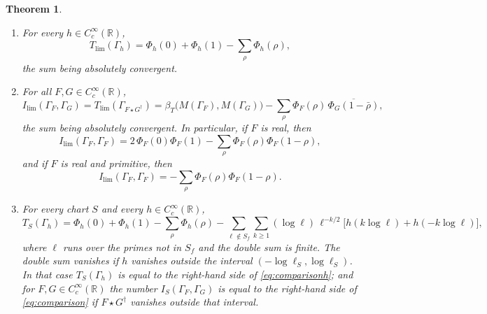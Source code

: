 \documentclass[11pt]{amsart}
\newtheorem{theorem}{Theorem}[section]
\theoremstyle{remark}
\numberwithin{equation}{section}
\newcommand{\R}{\mathbb R}
\newcommand{\Tl}{T_{\lim}}
\newcommand{\Il}{I_{\lim}}
\begin{document}
\begin{theorem}
\label{thm:comparison}
\begin{enumerate}
\item[(i)] For every $h\in C_c^\infty(\R)$,
\begin{equation}
\label{eq:comparisonh}
  \Tl(\Gamma_h)=\Phi_h(0)+\Phi_h(1)-\sum_\rho\Phi_h(\rho),
\end{equation}
the sum being absolutely convergent.
\item[(ii)] For all $F,G\in C_c^\infty(\R)$,
\begin{equation}
\label{eq:comparison}
  \Il(\Gamma_F,\Gamma_G)=\Tl(\Gamma_{F\star G^\dagger})
  =\beta_T\bigl(M(\Gamma_F),M(\Gamma_G)\bigr)
     -\sum_\rho\Phi_F(\rho)\,\overline{\Phi_G(1-\bar\rho)} ,
\end{equation}
the sum being absolutely convergent.  In particular, if $F$ is real, then
\begin{equation}
\label{eq:comparisonreal}
  \Il(\Gamma_F,\Gamma_F)
  =2\,\Phi_F(0)\Phi_F(1)-\sum_\rho\Phi_F(\rho)\Phi_F(1-\rho),
\end{equation}
and if $F$ is real and primitive, then
\begin{equation}
\label{eq:comparisonprim}
  \Il(\Gamma_F,\Gamma_F)=-\sum_\rho\Phi_F(\rho)\Phi_F(1-\rho).
\end{equation}
\item[(iii)] For every chart $S$ and every $h\in C_c^\infty(\R)$,
\begin{equation}
\label{eq:comparisonS}
  T_S(\Gamma_h)=\Phi_h(0)+\Phi_h(1)-\sum_\rho\Phi_h(\rho)
   -\sum_{\ell\notin S_f}\sum_{k\ge1}(\log\ell)\,\ell^{-k/2}
     \bigl[h(k\log\ell)+h(-k\log\ell)\bigr],
\end{equation}
where $\ell$ runs over the primes not in $S_f$ and the double sum is finite.
The double sum vanishes if $h$ vanishes outside the interval
$(-\log\ell_S,\log\ell_S)$.  In that case $T_S(\Gamma_h)$ is equal to the
right-hand side of \eqref{eq:comparisonh}; and for $F,G\in C_c^\infty(\R)$
the number $I_S(\Gamma_F,\Gamma_G)$ is equal to the right-hand side of
\eqref{eq:comparison} if $F\star G^\dagger$ vanishes outside that interval.
\end{enumerate}
\end{theorem}
\end{document}
